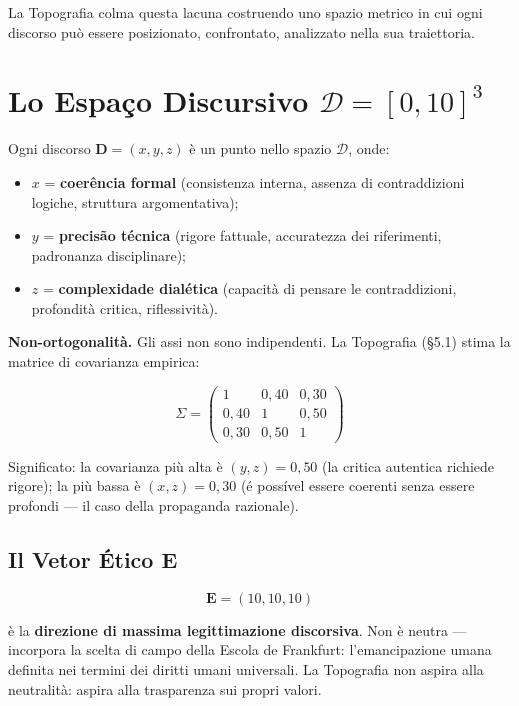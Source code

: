 La Topografia colma questa lacuna costruendo uno spazio metrico in cui
ogni discorso può essere posizionato, confrontato, analizzato nella sua
traiettoria.



\section{\texorpdfstring{Lo Espaço Discursivo
\(\mathcal{D} = [0, 10]^3\)}{Lo Espaço Discursivo \textbackslash mathcal\{D\} = {[}0, 10{]}\^{}3}}\label{lo-spazio-discorsivo-mathcald-0-103}

Ogni discorso \(\mathbf{D} = (x, y, z)\) è un punto nello spazio
\(\mathcal{D}\), onde:

\begin{itemize}
\tightlist
\item
  \(x\) = \textbf{coerência formal} (consistenza interna, assenza di
  contraddizioni logiche, struttura argomentativa);
\item
  \(y\) = \textbf{precisão técnica} (rigore fattuale, accuratezza dei
  riferimenti, padronanza disciplinare);
\item
  \(z\) = \textbf{complexidade dialética} (capacità di pensare le
  contraddizioni, profondità critica, riflessività).
\end{itemize}

\Hypoth{} \textbf{Non-ortogonalità.} Gli assi non sono indipendenti. La
Topografia (\S{}5.1) stima la matrice di covarianza empirica:

\[
\Sigma = \begin{pmatrix} 1 & 0{,}40 & 0{,}30 \\ 0{,}40 & 1 & 0{,}50 \\ 0{,}30 & 0{,}50 & 1 \end{pmatrix}
\]

\Proved{} Significato: la covarianza più alta è \((y, z) = 0{,}50\) (la
critica autentica richiede rigore); la più bassa è \((x, z) = 0{,}30\)
(é possível essere coerenti senza essere profondi --- il caso della
propaganda razionale).

\subsection{\texorpdfstring{Il Vetor Ético
\(\mathbf{E}\)}{Il Vetor Ético \textbackslash mathbf\{E\}}}\label{il-vettore-etico-mathbfe}

\[
\mathbf{E} = (10, 10, 10)
\]

è la \textbf{direzione di massima legittimazione discorsiva}. Non è
neutra --- incorpora la scelta di campo della Escola de Frankfurt:
l'emancipazione umana definita nei termini dei diritti umani universali.
La Topografia non aspira alla neutralità: aspira alla trasparenza sui
propri valori.



